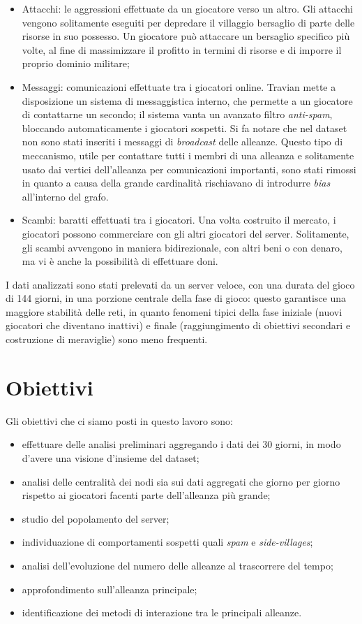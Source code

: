 \begin{itemize}
	\item Attacchi: le aggressioni effettuate da un giocatore verso un altro. Gli attacchi vengono solitamente eseguiti per depredare il villaggio bersaglio di parte delle risorse in suo possesso. Un giocatore può attaccare un bersaglio specifico più volte, al fine di massimizzare il profitto in termini di risorse e di imporre il proprio dominio militare;
	\item Messaggi: comunicazioni effettuate tra i giocatori online. Travian mette a disposizione un sistema di messaggistica interno, che permette a un giocatore di contattarne un secondo; il sistema vanta un avanzato filtro \textit{anti-spam}, bloccando automaticamente i giocatori sospetti.
	Si fa notare che nel dataset non sono stati inseriti i messaggi di \textit{broadcast} delle alleanze. Questo tipo di meccanismo, utile per contattare tutti i membri di una alleanza e solitamente usato dai vertici dell'alleanza per comunicazioni importanti, sono stati rimossi in quanto a causa della grande cardinalità rischiavano di introdurre \textit{bias} all'interno del grafo.
	\item Scambi: baratti effettuati tra i giocatori. Una volta costruito il mercato, i giocatori possono commerciare con gli altri giocatori del server. Solitamente, gli scambi avvengono in maniera bidirezionale, con altri beni o con denaro, ma vi è anche la possibilità di effettuare doni.
\end{itemize}
I dati analizzati sono stati prelevati da un server veloce, con una durata del gioco di 144 giorni, in una porzione centrale della fase di gioco: questo garantisce una maggiore stabilità delle reti, in quanto fenomeni tipici della fase iniziale (nuovi giocatori che diventano inattivi) e finale (raggiungimento di obiettivi secondari e costruzione di meraviglie) sono meno frequenti.

\section{Obiettivi}
Gli obiettivi che ci siamo posti in questo lavoro sono:
\begin{itemize}
	\item effettuare delle analisi preliminari aggregando i dati dei 30 giorni, in modo d'avere una visione d'insieme del dataset;
	\item analisi delle centralità dei nodi sia sui dati aggregati che giorno per giorno rispetto ai giocatori facenti parte dell'alleanza più grande;
	\item studio del popolamento del server;
	\item individuazione di comportamenti sospetti quali \textit{spam} e \textit{side-villages};
	\item analisi dell'evoluzione del numero delle alleanze al trascorrere del tempo;
	\item approfondimento sull'alleanza principale;
	\item identificazione dei metodi di interazione tra le principali alleanze.
\end{itemize}